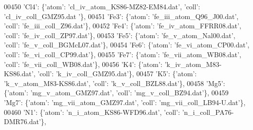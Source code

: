 \begin{DoxyCode}
00450                              \textcolor{stringliteral}{'Cl4'}: \{\textcolor{stringliteral}{'atom'}: \textcolor{stringliteral}{'cl\_iv\_atom\_KS86-MZ82-EM84.dat'}, \textcolor{stringliteral}{'coll'}: \textcolor{stringliteral}{'cl\_iv\_coll\_GMZ95.dat
      '}\},
00451                              \textcolor{stringliteral}{'Fe3'}: \{\textcolor{stringliteral}{'atom'}: \textcolor{stringliteral}{'fe\_iii\_atom\_Q96\_J00.dat'}, \textcolor{stringliteral}{'coll'}: \textcolor{stringliteral}{'fe\_iii\_coll\_Z96.dat'}\},
00452                              \textcolor{stringliteral}{'Fe4'}: \{\textcolor{stringliteral}{'atom'}: \textcolor{stringliteral}{'fe\_iv\_atom\_FFRR08.dat'}, \textcolor{stringliteral}{'coll'}: \textcolor{stringliteral}{'fe\_iv\_coll\_ZP97.dat'}\},
00453                              \textcolor{stringliteral}{'Fe5'}: \{\textcolor{stringliteral}{'atom'}: \textcolor{stringliteral}{'fe\_v\_atom\_Nal00.dat'}, \textcolor{stringliteral}{'coll'}: \textcolor{stringliteral}{'fe\_v\_coll\_BGMcL07.dat'}\},
00454                              \textcolor{stringliteral}{'Fe6'}: \{\textcolor{stringliteral}{'atom'}: \textcolor{stringliteral}{'fe\_vi\_atom\_CP00.dat'}, \textcolor{stringliteral}{'coll'}: \textcolor{stringliteral}{'fe\_vi\_coll\_CP99.dat'}\},
00455                              \textcolor{stringliteral}{'Fe7'}: \{\textcolor{stringliteral}{'atom'}: \textcolor{stringliteral}{'fe\_vii\_atom\_WB08.dat'}, \textcolor{stringliteral}{'coll'}: \textcolor{stringliteral}{'fe\_vii\_coll\_WB08.dat'}\},
00456                              \textcolor{stringliteral}{'K4'}: \{\textcolor{stringliteral}{'atom'}: \textcolor{stringliteral}{'k\_iv\_atom\_M83-KS86.dat'}, \textcolor{stringliteral}{'coll'}: \textcolor{stringliteral}{'k\_iv\_coll\_GMZ95.dat'}\},
00457                              \textcolor{stringliteral}{'K5'}: \{\textcolor{stringliteral}{'atom'}: \textcolor{stringliteral}{'k\_v\_atom\_M83-KS86.dat'}, \textcolor{stringliteral}{'coll'}: \textcolor{stringliteral}{'k\_v\_coll\_BZL88.dat'}\},
00458                              \textcolor{stringliteral}{'Mg5'}: \{\textcolor{stringliteral}{'atom'}: \textcolor{stringliteral}{'mg\_v\_atom\_GMZ97.dat'}, \textcolor{stringliteral}{'coll'}: \textcolor{stringliteral}{'mg\_v\_coll\_BZ94.dat'}\},
00459                              \textcolor{stringliteral}{'Mg7'}: \{\textcolor{stringliteral}{'atom'}: \textcolor{stringliteral}{'mg\_vii\_atom\_GMZ97.dat'}, \textcolor{stringliteral}{'coll'}: \textcolor{stringliteral}{'mg\_vii\_coll\_LB94-U.dat'}\},
00460                              \textcolor{stringliteral}{'N1'}: \{\textcolor{stringliteral}{'atom'}: \textcolor{stringliteral}{'n\_i\_atom\_KS86-WFD96.dat'}, \textcolor{stringliteral}{'coll'}: \textcolor{stringliteral}{'n\_i\_coll\_PA76-DMR76.dat'}\},

\end{DoxyCode}
